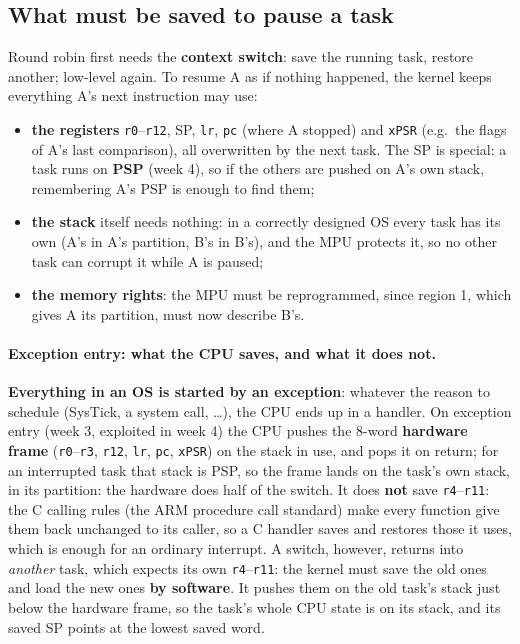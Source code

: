 \subsection{What must be saved to pause a task}
Round robin first needs the \textbf{context switch}: save the running task, restore another; low-level again. To resume A as if nothing happened, the kernel keeps everything A's next instruction may use:
\begin{itemize}
    \item \textbf{the registers} \texttt{r0}--\texttt{r12}, SP, \texttt{lr}, \texttt{pc} (where A stopped) and \texttt{xPSR} (e.g.\ the flags of A's last comparison), all overwritten by the next task. The SP is special: a task runs on \textbf{PSP} (week 4), so if the others are pushed on A's own stack, remembering A's PSP is enough to find them;
    \item \textbf{the stack} itself needs nothing: in a correctly designed OS every task has its own (A's in A's partition, B's in B's), and the MPU protects it, so no other task can corrupt it while A is paused;
    \item \textbf{the memory rights}: the MPU must be reprogrammed, since region 1, which gives A its partition, must now describe B's.
\end{itemize}

\paragraph{Exception entry: what the CPU saves, and what it does not.} \textbf{Everything in an OS is started by an exception}: whatever the reason to schedule (SysTick, a system call, \dots), the CPU ends up in a handler. On exception entry (week 3, exploited in week 4) the CPU pushes the 8-word \textbf{hardware frame} (\texttt{r0}--\texttt{r3}, \texttt{r12}, \texttt{lr}, \texttt{pc}, \texttt{xPSR}) on the stack in use, and pops it on return; for an interrupted task that stack is PSP, so the frame lands on the task's own stack, in its partition: the hardware does half of the switch. It does \textbf{not} save \texttt{r4}--\texttt{r11}: the C calling rules (the ARM procedure call standard) make every function give them back unchanged to its caller, so a C handler saves and restores those it uses, which is enough for an ordinary interrupt. A switch, however, returns into \emph{another} task, which expects its own \texttt{r4}--\texttt{r11}: the kernel must save the old ones and load the new ones \textbf{by software}. It pushes them on the old task's stack just below the hardware frame, so the task's whole CPU state is on its stack, and its saved SP points at the lowest saved word.

